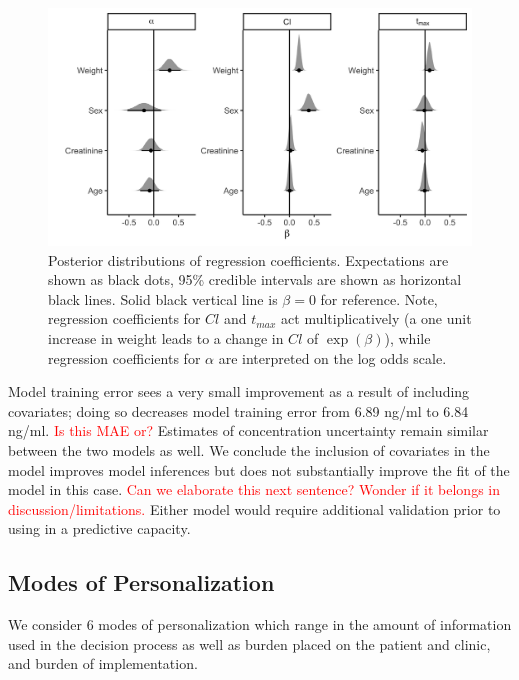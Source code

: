 \begin{figure}
	\centering
	\includegraphics[width=1\linewidth]{figures/coef_vals}
	\caption{Posterior distributions of regression coefficients. Expectations are shown as black dots, 95\% credible intervals are shown as horizontal black lines.  Solid black vertical line is $\beta=0$ for reference.  Note, regression coefficients for $Cl$ and $t_{max}$ act multiplicatively (a one unit increase in weight leads to a change in $Cl$ of $\exp(\beta)$), while regression coefficients for $\alpha$ are interpreted on the log odds scale.}
	\label{fig:coefvals}
\end{figure}


Model training error sees a very small improvement as a result of including covariates; doing so decreases model training error from 6.89 ng/ml to 6.84 ng/ml. \textcolor{red}{Is this MAE or?} Estimates of concentration uncertainty remain similar between the two models as well.  We conclude the inclusion of covariates in the model improves model inferences but does not substantially improve the fit of the model in this case.  \textcolor{red}{Can we elaborate this next sentence? Wonder if it belongs in discussion/limitations.} Either model would require additional validation prior to using in a predictive capacity.

\subsection{Modes of Personalization}

We consider 6 modes of personalization which range in the amount of information used in the decision process as well as burden placed on the patient and clinic, and burden of implementation. 

